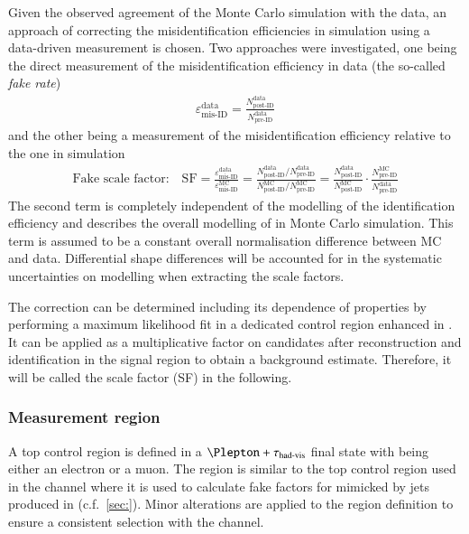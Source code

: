Given the observed agreement of the Monte Carlo simulation with the
data, an approach of correcting the misidentification efficiencies in
simulation using a data-driven measurement is chosen. Two approaches
were investigated, one being the direct measurement of the
misidentification efficiency in data (the so-called \textit{fake
  rate})
\begin{align*}
  \varepsilon_\text{mis-ID}^\text{data} = \frac{N_\text{post-ID}^\text{data}}{N_\text{pre-ID}^\text{data}}
\end{align*}
and the other being a measurement of the misidentification efficiency
relative to the one in simulation
\begin{align*}
  \text{Fake scale factor:}\quad
  \text{SF} =
  \frac{\varepsilon_\text{mis-ID}^\text{data}}{\varepsilon_\text{mis-ID}^\text{MC}} =
  \frac{N_\text{post-ID}^\text{data} / N_\text{pre-ID}^\text{data}}{N_\text{post-ID}^\text{MC} / N_\text{pre-ID}^\text{MC}}
  = \frac{N_\text{post-ID}^\text{data}}{N_\text{post-ID}^\text{MC}} \cdot \frac{N_\text{pre-ID}^\text{MC}}{N_\text{pre-ID}^\text{data}}
\end{align*}
The second term is completely independent of the modelling of the
\tauhadvis identification efficiency and describes the overall
modelling of \ttbar in Monte Carlo simulation. This term is assumed to
be a constant overall normalisation difference between MC and
data. Differential shape differences will be accounted for in the
systematic uncertainties on \ttbar modelling when extracting the scale
factors.

The correction can be determined including its dependence of
\faketauhadvis properties by performing a maximum likelihood fit in a
dedicated control region enhanced in \ttbar. It can be applied as a
multiplicative factor on \faketauhadvis candidates after \tauhadvis
reconstruction and identification in the \hadhad signal region to
obtain a background estimate. Therefore, it will be called the
\faketauhadvis scale factor (SF) in the following.


\subsubsection{Measurement region}

A top control region is defined in a $\Plepton + \tauhadvis$ final
state with \Plepton being either an electron or a muon. The region is
similar to the top control region used in the \lephad channel where it
is used to calculate fake factors for \tauhadvis mimicked by jets
produced in \ttbar (c.f.\ \cref{sec:}). Minor alterations are applied
to the region definition to ensure a consistent \tauhadvis selection
with the \hadhad channel.


